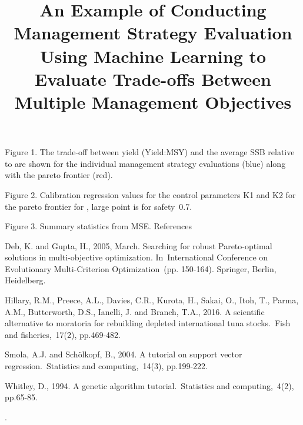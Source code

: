 \documentclass[12pt,doublespacing,a4paper]{ouparticle}
\begin{document}
Figure 1. The trade-off between yield (Yield:MSY) and the average SSB relative to  are shown for the individual management strategy evaluations (blue) along with the pareto frontier (red).

Figure 2. Calibration regression values for the control parameters K1 and K2 for the pareto frontier for , large point is for safety~0.7.


Figure 3. Summary statistics from MSE.
References

Deb, K. and Gupta, H., 2005, March. Searching for robust Pareto-optimal solutions in multi-objective optimization. In International Conference on Evolutionary Multi-Criterion Optimization (pp. 150-164). Springer, Berlin, Heidelberg.

Hillary, R.M., Preece, A.L., Davies, C.R., Kurota, H., Sakai, O., Itoh, T., Parma, A.M., Butterworth, D.S., Ianelli, J. and Branch, T.A., 2016. A scientific alternative to moratoria for rebuilding depleted international tuna stocks. Fish and fisheries, 17(2), pp.469-482.

Smola, A.J. and Schölkopf, B., 2004. A tutorial on support vector regression. Statistics and computing, 14(3), pp.199-222.

Whitley, D., 1994. A genetic algorithm tutorial. Statistics and computing, 4(2), pp.65-85.

.
\title{An Example of Conducting Management Strategy Evaluation Using Machine Learning to Evaluate Trade-offs Between Multiple Management Objectives}

\author{%
}

\end{document}
